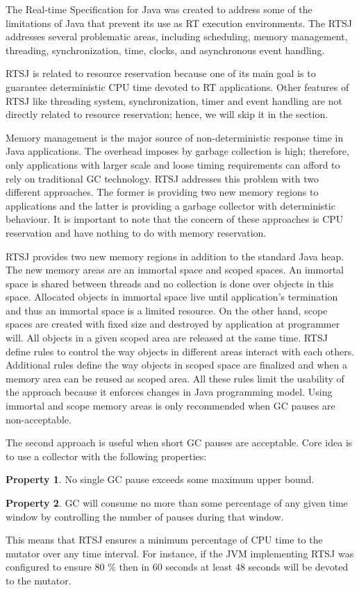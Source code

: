The Real-time Specification for Java was created to address some of the limitations of Java that prevent its use as RT execution environments. The RTSJ addresses several problematic areas, including scheduling, memory management, threading, synchronization, time, clocks, and asynchronous event handling.

RTSJ is related to resource reservation because one of its main goal is to guarantee deterministic CPU time devoted to RT applications. Other features of RTSJ like threading system, synchronization, timer and event handling are not directly related to resource reservation; hence, we will skip it in the section.

Memory management is the major source of non-deterministic response time in Java applications. The overhead imposes by garbage collection is high; therefore, only applications with larger scale and loose timing requirements can afford to rely on traditional GC technology.
RTSJ addresses this problem with two different approaches.
The former is providing two new memory regions to applications and the latter is providing a garbage collector with deterministic behaviour.
It is important to note that the concern of these approaches is CPU reservation and have nothing to do with memory reservation.

RTSJ provides two new memory regions in addition to the standard Java heap.
The new memory areas are an immortal space and scoped spaces.
An immortal space is shared between threads and no collection is done over objects in this space.
Allocated objects in immortal space live until application's termination and thus an immortal space is a limited resource.
On the other hand, scope spaces are created with fixed size and destroyed by application at programmer will.
All objects in a given scoped area are released at the same time.
RTSJ define rules to control the way objects in different areas interact with each others.
Additional rules define the way objects in scoped space are finalized and when a memory area can be reused as scoped area.
All these rules limit the usability of the approach because it enforces changes in Java programming model.
Using immortal and scope memory areas is only recommended when GC pauses are non-acceptable.

The second approach is useful when short GC pauses are acceptable. Core idea is to use a collector with the following properties:
\begin{description}
\item \textbf{Property 1}. No single GC pause exceeds some maximum upper bound.
\item \textbf{Property 2}. GC will consume no more than some percentage of any given time window by controlling the number of pauses during that window.
\end{description} 
This means that RTSJ ensures a minimum percentage of CPU time to the mutator over any time interval.
For instance, if the JVM implementing RTSJ was configured to ensure 80 $\%$ then in 60 seconds at least 48 seconds will be devoted to the mutator.

